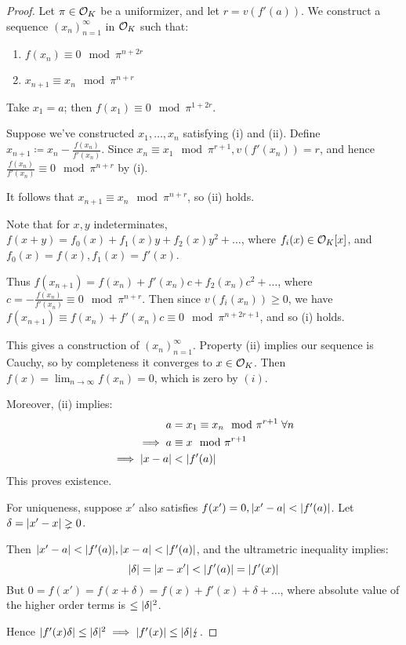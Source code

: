 \documentclass[10pt,a4paper]{article}
\begin{document}
\begin{proof}
  Let $\pi \in \mathcal{O}_K$ be a uniformizer, and let $r = v(f'(a))$. We construct a sequence $(x_n)_{n=1}^\infty$ in $\mathcal{O}_K$ such that:
  \begin{enumerate}[label=(\roman*)]
    \item $f(x_n) \equiv 0 \mod \pi^{n+2r}$
    \item $x_{n+1} \equiv x_n \mod \pi^{n+r}$
  \end{enumerate}
  Take $x_1 = a$; then $f(x_1) \equiv 0 \mod \pi^{1+2r}$.

  Suppose we've constructed $x_1, \ldots, x_n$ satisfying (i) and (ii). Define $x_{n+1}\coloneqq x_n - \frac{f(x_n)}{f'(x_n)}$. Since $x_n \equiv x_1 \mod \pi^{r+1}, v(f'(x_n)) = r$, and hence $\frac{f(x_n)}{f'(x_n)}\equiv 0 \mod \pi^{n+r}$ by (i).

  It follows that $x_{n+1} \equiv x_n \mod \pi^{n+r}$, so (ii) holds.

  Note that for $x, y$ indeterminates, $f(x+y) = f_0(x)+f_1(x)y + f_2(x)y^2 + \ldots$, where $f_i(x) \in \mathcal{O}_K[x]$, and $f_0(x) = f(x), f_1(x) = f'(x)$.

  Thus $f(x_{n+1}) = f(x_n) + f'(x_n)c+f_2(x_n)c^2 + \ldots$, where $c = -\frac{f(x_n)}{f'(x_n)} \equiv 0 \mod \pi^{n+r}$. Then since $v(f_i(x_n)) \geq 0$, we have $f(x_{n+1}) \equiv f(x_n) + f'(x_n)c \equiv 0 \mod \pi^{n+2r+1}$, and so (i) holds.

  This gives a construction of $(x_n)_{n=1}^\infty$. Property (ii) implies our sequence is Cauchy, so by completeness it converges to $x \in \mathcal{O}_K$. Then $f(x) = \lim_{n\to\infty} f(x_n) = 0$, which is zero by $(i)$.

  Moreover, (ii) implies:
  \begin{align*}
    a &= x_1 \equiv x_n \mod \pi^{r+1} \forall n\\
    \implies a &\equiv x \mod \pi^{r+1}\\
    \implies \abs{x-a} &< \abs{f'(a)}
  \end{align*}
  This proves existence.

  For uniqueness, suppose $x'$ also satisfies $f(x') = 0, \lvert x'-a\rvert < \lvert f'(a)\rvert$. Let $\delta = \lvert x'-x\rvert \gneq 0$.

  Then $\lvert x'-a\rvert < \lvert f'(a)\rvert, \lvert x-a\rvert < \lvert f'(a)\rvert$, and the ultrametric inequality implies:
  \[\lvert\delta\rvert = \lvert x-x'\rvert < \lvert f'(a)\rvert = \lvert f'(x)\rvert\]
  But $0 = f(x') = f(x+\delta) = f(x) + f'(x)+\delta + \ldots$, where absolute value of the higher order terms is $\leq \lvert\delta\rvert^2$.

  Hence $\lvert f'(x)\delta\rvert \leq \lvert\delta\rvert^2 \implies \lvert f'(x)\rvert \leq \lvert\delta\rvert \lightning$.
\end{proof}
\end{document}
